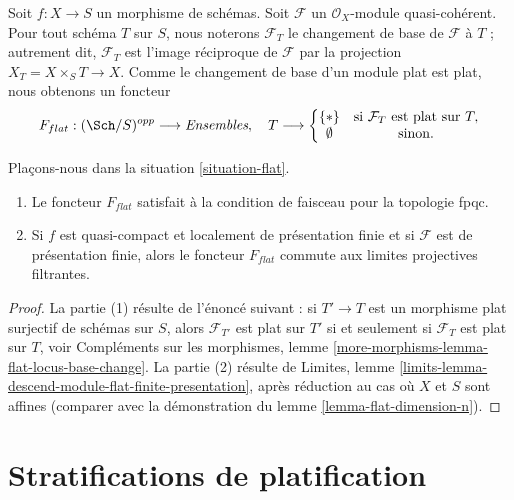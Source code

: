 \begin{situation}
\label{situation-flat}
Soit $f : X \to S$ un morphisme de schémas.
Soit $\mathcal{F}$ un $\mathcal{O}_X$-module quasi-cohérent.
Pour tout schéma $T$ sur $S$, nous noterons $\mathcal{F}_T$ le
changement de base de $\mathcal{F}$ à $T$ ; autrement dit, $\mathcal{F}_T$
est l'image réciproque de $\mathcal{F}$ par la projection
$X_T = X \times_S T \to X$. Comme le changement de base d'un module plat
est plat, nous obtenons un foncteur
\begin{equation}
\label{equation-flat}
F_{flat} : (\Sch/S)^{opp} \longrightarrow \textit{Ensembles}, \quad
T \longrightarrow \left\{
\begin{matrix}
\{*\} & \text{si } \mathcal{F}_T \text{ est plat sur }T, \\
\emptyset & \text{sinon.}
\end{matrix}
\right.
\end{equation}
\end{situation}

\begin{lemma}
\label{lemma-flat}
Plaçons-nous dans la situation \ref{situation-flat}.
\begin{enumerate}
\item Le foncteur $F_{flat}$ satisfait à la condition de faisceau pour la topologie fpqc.
\item Si $f$ est quasi-compact et localement de présentation finie
et si $\mathcal{F}$ est de présentation finie, alors le foncteur
$F_{flat}$ commute aux limites projectives filtrantes.
\end{enumerate}
\end{lemma}

\begin{proof}
La partie (1) résulte de l'énoncé suivant : si $T' \to T$ est un morphisme plat
surjectif de schémas sur $S$, alors $\mathcal{F}_{T'}$ est plat sur $T'$
si et seulement si $\mathcal{F}_T$ est plat sur $T$, voir
Compléments sur les morphismes, lemme \ref{more-morphisms-lemma-flat-locus-base-change}.
La partie (2) résulte de
Limites, lemme \ref{limits-lemma-descend-module-flat-finite-presentation},
après réduction au cas où $X$ et $S$ sont affines (comparer avec
la démonstration du
lemme \ref{lemma-flat-dimension-n}).
\end{proof}




\section{Stratifications de platification}
\label{section-flattening}

